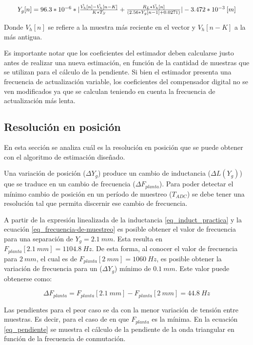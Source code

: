 \begin{equation*}
	\resizebox{.95\hsize}{!}
	{
	$
	Y_g[n] = 96.3*10^{-6}*|\frac{\hat{V_h}[n]-\hat{V_h}[n-K]}{K*T_S} + \frac{R_L*\bar{V_h}[n]}{(2.56*Y_g[n-1]+0.0271)}|-3.472*10^{-3}\:[m]
	$
	}
\end{equation*}


Donde $V_h[n]$ se refiere a la muestra más reciente en el vector y $V_h[n-K]$ a la más antigua.

Es importante notar que los coeficientes del estimador deben calcularse justo antes de realizar una nueva estimación,  en función de la cantidad de muestras que se utilizan para el cálculo de la pendiente. Si bien el estimador presenta una frecuencia de actualización variable, los coeficientes del compensador digital no se ven modificados ya que se calculan teniendo en cuenta la frecuencia de actualización más lenta.


\subsection{Resolución en posición}

En esta sección se analiza cuál es la resolución en posición que se puede obtener con el algoritmo de estimación diseñado.

Una variación de posición ($\Delta Y_g$) produce un cambio de inductancia ($\Delta L(Y_g)$) que se traduce en un cambio de frecuencia ($\Delta F_{planta}$). Para poder detectar el mínimo cambio de posición en un período de muestreo ($T_{ADC}$) se debe tener una resolución tal que permita discernir ese cambio de frecuencia.


A partir de la expresión linealizada de la inductancia \ref{eq_induct_practica} y la ecuación \ref{eq_frecuencia-de-muestreo} es posible obtener el valor de frecuencia para una separación de $Y_g=2.1\:mm$. Esta resulta en $F_{planta}[2.1\:mm] = 1104.8\:Hz$. De esta forma, al conocer el valor de frecuencia para $2\:mm$, el cual es de $F_{planta}[2\:mm] = 1060\:Hz$, es posible obtener la variación de frecuencia para un ($\Delta Y_g$) mínimo de  $0.1\:mm$. Este valor puede obtenerse como:

\begin{equation} 
	\Delta F_{planta} = F_{planta}[2.1\:mm] - F_{planta}[2\:mm] = 44.8\:Hz
\end{equation}

 Las pendientes para el peor caso se da con la menor variación de tensión entre muestras. Es decir, para el caso de en que $F_{planta}$ es la mínima. En la ecuación \ref{eq_pendiente} se muestra el cálculo de la pendiente de la onda triangular en función de la frecuencia de conmutación.

